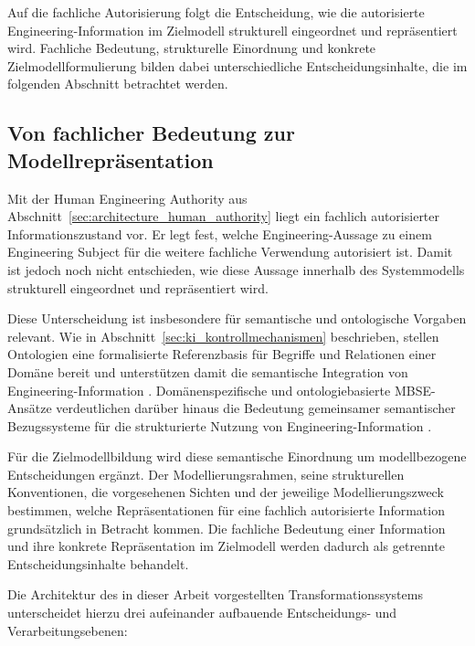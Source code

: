 Auf die fachliche Autorisierung folgt die Entscheidung, wie die autorisierte
Engineering-Information im Zielmodell strukturell eingeordnet und
repräsentiert wird. Fachliche Bedeutung, strukturelle Einordnung und
konkrete Zielmodellformulierung bilden dabei unterschiedliche
Entscheidungsinhalte, die im folgenden Abschnitt betrachtet werden.

\subsection{Von fachlicher Bedeutung zur Modellrepräsentation}
\label{sec:architecture_meaning_representation}

Mit der Human Engineering Authority aus
Abschnitt~\ref{sec:architecture_human_authority} liegt ein fachlich
autorisierter Informationszustand vor. Er legt fest, welche
Engineering-Aussage zu einem Engineering Subject für die weitere fachliche
Verwendung autorisiert ist. Damit ist jedoch noch nicht entschieden, wie
diese Aussage innerhalb des Systemmodells strukturell eingeordnet und
repräsentiert wird.

Diese Unterscheidung ist insbesondere für semantische und ontologische
Vorgaben relevant. Wie in
Abschnitt~\ref{sec:ki_kontrollmechanismen} beschrieben, stellen Ontologien
eine formalisierte Referenzbasis für Begriffe und Relationen einer Domäne
bereit und unterstützen damit die semantische Integration von
Engineering-Information \cite{OrellanaMandrick2019,Lu2022}.
Domänenspezifische und ontologiebasierte MBSE-Ansätze verdeutlichen darüber
hinaus die Bedeutung gemeinsamer semantischer Bezugssysteme für die
strukturierte Nutzung von Engineering-Information
\cite{Liu2025SysDO,Dong2026}.

Für die Zielmodellbildung wird diese semantische Einordnung um
modellbezogene Entscheidungen ergänzt. Der Modellierungsrahmen, seine
strukturellen Konventionen, die vorgesehenen Sichten und der jeweilige
Modellierungszweck bestimmen, welche Repräsentationen für eine fachlich
autorisierte Information grundsätzlich in Betracht kommen. Die fachliche
Bedeutung einer Information und ihre konkrete Repräsentation im Zielmodell
werden dadurch als getrennte Entscheidungsinhalte behandelt.

Die Architektur des in dieser Arbeit vorgestellten Transformationssystems
unterscheidet hierzu drei aufeinander aufbauende Entscheidungs- und
Verarbeitungsebenen:

